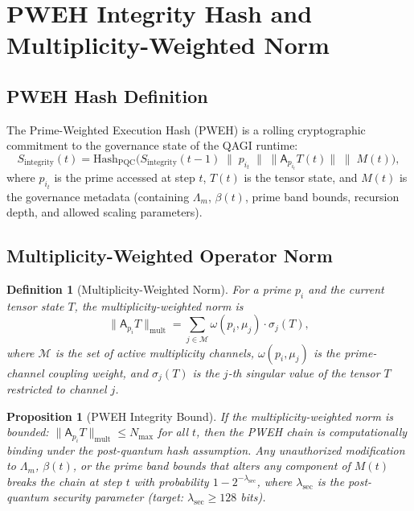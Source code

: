 \documentclass[11pt]{amsart}
\newtheorem{proposition}[theorem]{Proposition}
\newtheorem{definition}[theorem]{Definition}
\newcommand{\Ap}{\mathsf{A}}
\newcommand{\norm}[1]{\lVert #1 \rVert}
\begin{document}
\section{PWEH Integrity Hash and Multiplicity-Weighted Norm}
\label{sec:pweh}

\subsection{PWEH Hash Definition}

The Prime-Weighted Execution Hash (PWEH) is a rolling cryptographic commitment to the governance state of the QAGI runtime:
\[
  S_{\mathrm{integrity}}(t) = \mathrm{Hash}_{\mathrm{PQC}}\!\bigl(S_{\mathrm{integrity}}(t-1) \;\|\; p_{i_t} \;\|\; \norm{\Ap_{p_{i_t}} T(t)} \;\|\; M(t)\bigr),
\]
where $p_{i_t}$ is the prime accessed at step $t$, $T(t)$ is the tensor state, and $M(t)$ is the governance metadata (containing $\Lambda_m$, $\beta(t)$, prime band bounds, recursion depth, and allowed scaling parameters).

\subsection{Multiplicity-Weighted Operator Norm}

\begin{definition}[Multiplicity-Weighted Norm]\label{def:mult-norm}
For a prime $p_i$ and the current tensor state $T$, the \emph{multiplicity-weighted norm} is
\[
  \norm{\Ap_{p_i} T}_{\mathrm{mult}} = \sum_{j \in \mathcal{M}} \omega(p_i, \mu_j) \cdot \sigma_j(T),
\]
where $\mathcal{M}$ is the set of active multiplicity channels, $\omega(p_i, \mu_j)$ is the prime-channel coupling weight, and $\sigma_j(T)$ is the $j$-th singular value of the tensor $T$ restricted to channel $j$.
\end{definition}

\begin{proposition}[PWEH Integrity Bound]\label{prop:pweh-bound}
If the multiplicity-weighted norm is bounded: $\norm{\Ap_{p_i} T}_{\mathrm{mult}} \leq N_{\max}$ for all $t$, then the PWEH chain is computationally binding under the post-quantum hash assumption. Any unauthorized modification to $\Lambda_m$, $\beta(t)$, or the prime band bounds that alters any component of $M(t)$ breaks the chain at step $t$ with probability $1 - 2^{-\lambda_{\mathrm{sec}}}$, where $\lambda_{\mathrm{sec}}$ is the post-quantum security parameter (target: $\lambda_{\mathrm{sec}} \geq 128$ bits).
\end{proposition}
\end{document}
